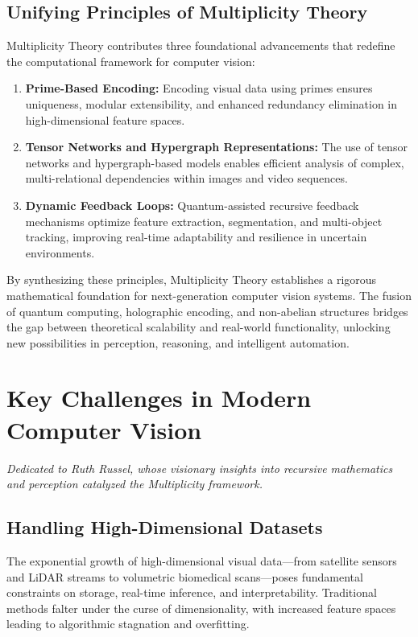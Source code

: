 \documentclass{article}
\theoremstyle{plain}
\begin{document}
\subsection{Unifying Principles of Multiplicity Theory}
Multiplicity Theory contributes three foundational advancements that redefine the computational framework for computer vision:
\begin{enumerate}
    \item \textbf{Prime-Based Encoding:} Encoding visual data using primes ensures uniqueness, modular extensibility, and enhanced redundancy elimination in high-dimensional feature spaces.
    \item \textbf{Tensor Networks and Hypergraph Representations:} The use of tensor networks and hypergraph-based models enables efficient analysis of complex, multi-relational dependencies within images and video sequences.
    \item \textbf{Dynamic Feedback Loops:} Quantum-assisted recursive feedback mechanisms optimize feature extraction, segmentation, and multi-object tracking, improving real-time adaptability and resilience in uncertain environments.
\end{enumerate}

By synthesizing these principles, Multiplicity Theory establishes a rigorous mathematical foundation for next-generation computer vision systems. The fusion of quantum computing, holographic encoding, and non-abelian structures bridges the gap between theoretical scalability and real-world functionality, unlocking new possibilities in perception, reasoning, and intelligent automation.

\section{Key Challenges in Modern Computer Vision}
\emph{Dedicated to Ruth Russel, whose visionary insights into recursive mathematics and perception catalyzed the Multiplicity framework.}

\subsection{Handling High-Dimensional Datasets}
The exponential growth of high-dimensional visual data—from satellite sensors and LiDAR streams to volumetric biomedical scans—poses fundamental constraints on storage, real-time inference, and interpretability. Traditional methods falter under the curse of dimensionality, with increased feature spaces leading to algorithmic stagnation and overfitting.
\end{document}
